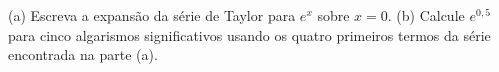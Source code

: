 (a) Escreva a expansão da série de Taylor para $e^x$ sobre $x = 0$. (b) Calcule $e^{0,5}$ para cinco algarismos significativos usando os quatro primeiros termos da série encontrada na parte (a).

